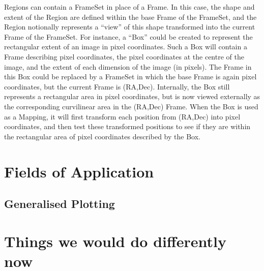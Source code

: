 \documentclass[final,authoryear,5p,times,twocolumn]{elsarticle}
\begin{document}
Regions can contain a FrameSet in place of a Frame. In this case, the
shape and extent of the Region are defined within the base Frame of
the FrameSet, and the Region notionally represents a ``view'' of this
shape transformed into the current Frame of the FrameSet. For
instance, a ``Box'' could be created to represent the rectangular extent
of an image in pixel coordinates. Such a Box will contain a Frame
describing pixel coordinates, the pixel coordinates at the centre of
the image, and the extent of each dimension of the image (in
pixels). The Frame in this Box could be replaced by a FrameSet in
which the base Frame is again pixel coordinates, but the current Frame
is (RA,Dec). Internally, the Box still represents a rectangular area
in pixel coordinates, but is now viewed externally as the
corresponding curvilinear area in the (RA,Dec) Frame. When the Box is
used as a Mapping, it will first transform each position from (RA,Dec)
into pixel coordinates, and then test these transformed positions to
see if they are within the rectangular area of pixel coordinates
described by the Box.

\section{Fields of Application}



\subsection{Generalised Plotting}

\section{Things we would do differently now}
\end{document}
